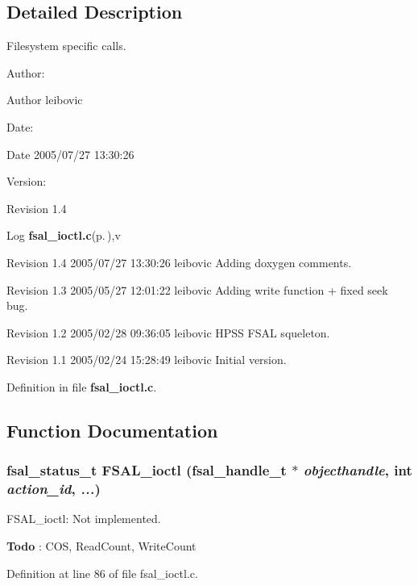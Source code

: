 \subsection{Detailed Description}
Filesystem specific calls. 

\begin{Desc}
\item[Author:]\begin{Desc}
\item[Author]leibovic \end{Desc}
\end{Desc}
\begin{Desc}
\item[Date:]\begin{Desc}
\item[Date]2005/07/27 13:30:26 \end{Desc}
\end{Desc}
\begin{Desc}
\item[Version:]\begin{Desc}
\item[Revision]1.4 \end{Desc}
\end{Desc}
\begin{Desc}
\item[Log]{\bf fsal\_\-ioctl.c}{\rm (p.\,\pageref{fsal__ioctl_8c})},v \end{Desc}
Revision 1.4 2005/07/27 13:30:26 leibovic Adding doxygen comments.

Revision 1.3 2005/05/27 12:01:22 leibovic Adding write function + fixed seek bug.

Revision 1.2 2005/02/28 09:36:05 leibovic HPSS FSAL squeleton.

Revision 1.1 2005/02/24 15:28:49 leibovic Initial version.

Definition in file {\bf fsal\_\-ioctl.c}.

\subsection{Function Documentation}
\subsubsection{\setlength{\rightskip}{0pt plus 5cm}fsal\_\-status\_\-t FSAL\_\-ioctl (fsal\_\-handle\_\-t $\ast$ {\em objecthandle}, int {\em action\_\-id},  {\em ...})}\label{fsal__ioctl_8c_a4}


FSAL\_\-ioctl: Not implemented.

\begin{Desc}
\item[{\bf Todo}]: COS, Read\-Count, Write\-Count\end{Desc}


Definition at line 86 of file fsal\_\-ioctl.c.